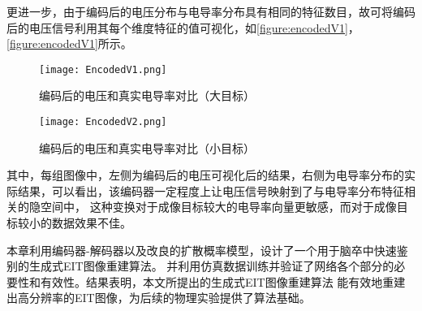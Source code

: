 更进一步，由于编码后的电压分布与电导率分布具有相同的特征数目，故可将编码后的电压信号利用其每个维度特征的值可视化，如\cref{figure:encodedV1}，\cref{figure:encodedV1}所示。

\begin{figure}[h]
    \centering
    \texttt{[image: EncodedV1.png]}
    \caption{编码后的电压和真实电导率对比（大目标）}
    \label{figure:EncodedV1}
\end{figure}

\begin{figure}[h]
    \centering
    \texttt{[image: EncodedV2.png]}
    \caption{编码后的电压和真实电导率对比（小目标）}
    \label{figure:EncodedV2}
\end{figure}

其中，每组图像中，左侧为编码后的电压可视化后的结果，右侧为电导率分布的实际结果，可以看出，该编码器一定程度上让电压信号映射到了与电导率分布特征相关的隐空间中，
这种变换对于成像目标较大的电导率向量更敏感，而对于成像目标较小的数据效果不佳。



本章利用编码器-解码器以及改良的扩散概率模型，设计了一个用于脑卒中快速鉴别的生成式EIT图像重建算法。
并利用仿真数据训练并验证了网络各个部分的必要性和有效性。结果表明，本文所提出的生成式EIT图像重建算法
能有效地重建出高分辨率的EIT图像，为后续的物理实验提供了算法基础。
